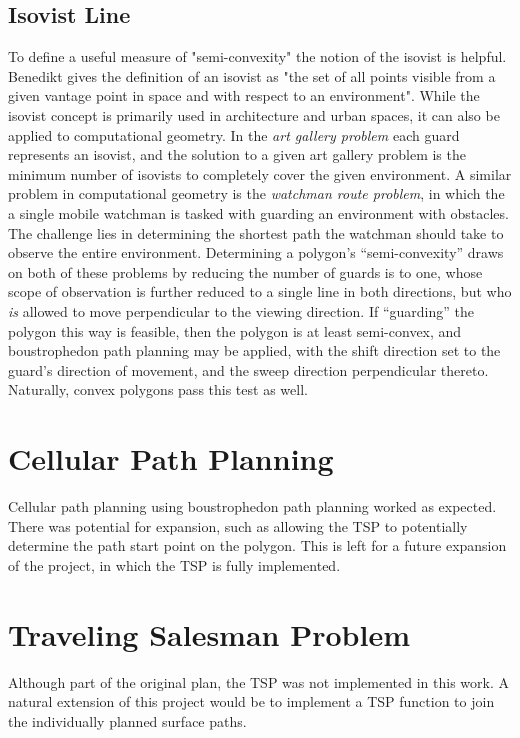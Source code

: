 \subsection{Isovist Line}
To define a useful measure of "semi-convexity" the notion of the isovist is helpful.
Benedikt gives the definition of an isovist as "the set of all points visible from a given vantage point in space and with respect to an environment"\cite{Isovists}.
While the isovist concept is primarily used in architecture and urban spaces, it can also be applied to computational geometry.
In the \textit{art gallery problem} each guard represents an isovist, and the solution to a given art gallery problem is the minimum number of isovists to completely cover the given environment.
A similar problem in computational geometry is the \textit{watchman route problem}, in which the a single mobile watchman is tasked with guarding an environment with obstacles.
The challenge lies in determining the shortest path the watchman should take to observe the entire environment.
Determining a polygon's ``semi-convexity'' draws on both of these problems by reducing the number of guards is to one, whose scope of observation is further reduced to a single line in both directions, but who \textit{is} allowed to move perpendicular to the viewing direction.
If ``guarding'' the polygon this way is feasible, then the polygon is at least semi-convex, and boustrophedon path planning may be applied, with the shift direction set to the guard's direction of movement, and the sweep direction perpendicular thereto.
Naturally, convex polygons pass this test as well.

\section{Cellular Path Planning}
Cellular path planning using boustrophedon path planning worked as expected.
There was potential for expansion, such as allowing the TSP to potentially determine the path start point on the polygon.
This is left for a future expansion of the project, in which the TSP is fully implemented.

\section{Traveling Salesman Problem}
Although part of the original plan, the TSP was not implemented in this work.
A natural extension of this project would be to implement a TSP function to join the individually planned surface paths.

